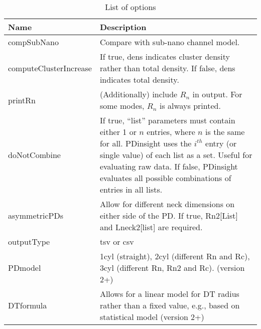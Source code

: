 \documentclass[a4paper,12pt]{article}
\begin{document}
\begin{table}
\caption{List of options}
\label{tab:options}
\begin{tabular}{l  p{}}
Name & Description\\
\hline
compSubNano & Compare with sub-nano channel model.\\
computeClusterIncrease & If true, dens indicates cluster density  rather than total density. If false, dens indicates total density.\\
printRn & (Additionally) include $R_n$ in output. For some modes, $R_n$ is always printed.\\
doNotCombine & If true, ``list'' parameters must contain either 1 or $n$ entries, where $n$ is the same for all. PDinsight uses the $i^{th}$ entry (or single value) of each list as a set. Useful for evaluating raw data. If false, PDinsight evaluates all possible combinations of entries in all lists. \\
asymmetricPDs & Allow for different neck dimensions on either side of the PD. If true, Rn2[List] and Lneck2[list] are required. \\
	outputType & tsv or csv\\
	PDmodel & 1cyl (straight), 2cyl (different Rn and Rc), 3cyl (different Rn, Rn2 and Rc). (version 2+)\\
	DTformula & Allows for a linear model for DT radius rather than a fixed value, e.g., based on statistical model (version 2+)\\

\end{tabular}
\end{table}





\end{document}
